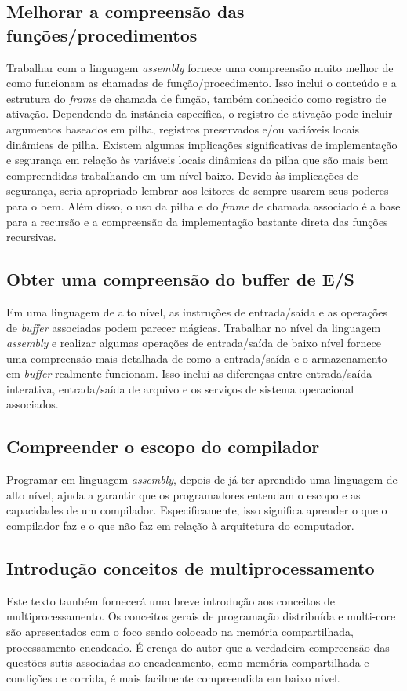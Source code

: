 \subsection{Melhorar a compreensão das funções/procedimentos}
Trabalhar com a linguagem \textit{assembly} fornece uma compreensão muito melhor de como funcionam as chamadas de função/procedimento. Isso inclui o conteúdo e a estrutura do \textit{frame} de chamada de função, também conhecido como registro de ativação. Dependendo da instância específica, o registro de ativação pode incluir argumentos baseados em pilha, registros preservados e/ou variáveis locais dinâmicas de pilha. Existem algumas implicações significativas de implementação e segurança em relação às variáveis locais dinâmicas da pilha que são mais bem compreendidas trabalhando em um nível baixo. Devido às implicações de segurança, seria apropriado lembrar aos leitores de sempre usarem seus poderes para o bem. Além disso, o uso da pilha e do \textit{frame} de chamada associado é a base para a recursão e a compreensão da implementação bastante direta das funções recursivas.

\subsection{Obter uma compreensão do buffer de E/S}
Em uma linguagem de alto nível, as instruções de entrada/saída e as operações de \textit{buffer} associadas podem parecer mágicas. Trabalhar no nível da linguagem \textit{assembly} e realizar algumas operações de entrada/saída de baixo nível fornece uma compreensão mais detalhada de como a entrada/saída e o armazenamento em \textit{buffer} realmente funcionam. Isso inclui as diferenças entre entrada/saída interativa, entrada/saída de arquivo e os serviços de sistema operacional associados.

\subsection{Compreender o escopo do compilador}
Programar em linguagem \textit{assembly}, depois de já ter aprendido uma linguagem de alto nível, ajuda a garantir que os programadores entendam o escopo e as capacidades de um compilador. Especificamente, isso significa aprender o que o compilador faz e o que não faz em relação à arquitetura do computador.

\subsection{Introdução conceitos de multiprocessamento}
Este texto também fornecerá uma breve introdução aos conceitos de multiprocessamento. Os conceitos gerais de programação distribuída e multi-core são apresentados com o foco sendo colocado na memória compartilhada, processamento encadeado. É crença do autor que a verdadeira compreensão das questões sutis associadas ao encadeamento, como memória compartilhada e condições de corrida, é mais facilmente compreendida em baixo nível.

